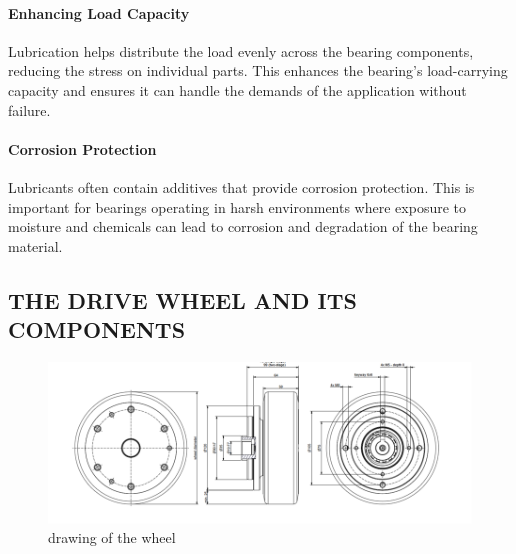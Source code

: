 \documentclass[../../main]{subfiles}
\begin{document}
\paragraph{Enhancing Load Capacity}
Lubrication helps distribute the load evenly across the bearing components, reducing the stress on individual parts. This enhances the bearing's load-carrying capacity and ensures it can handle the demands of the application without failure.

\paragraph{Corrosion Protection}
Lubricants often contain additives that provide corrosion protection. This is important for bearings operating in harsh environments where exposure to moisture and chemicals can lead to corrosion and degradation of the bearing material.


\subsection{THE DRIVE WHEEL AND ITS COMPONENTS }

\begin{figure}
  \centering
  \includegraphics[width=\textwidth]{img/Picture1.png}
  \caption{drawing of the wheel}
  \label{wheel}
\end{figure}
\end{document}
